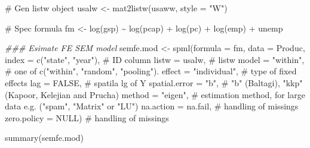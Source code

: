 \documentclass[
  letterpaper,
]{scrbook}
\newenvironment{Shaded}{\begin{snugshade}}{\end{snugshade}}
\newcommand{\AttributeTok}[1]{\textcolor[rgb]{0.40,0.45,0.13}{#1}}
\newcommand{\CommentTok}[1]{\textcolor[rgb]{0.37,0.37,0.37}{#1}}
\newcommand{\ConstantTok}[1]{\textcolor[rgb]{0.56,0.35,0.01}{#1}}
\newcommand{\DocumentationTok}[1]{\textcolor[rgb]{0.37,0.37,0.37}{\textit{#1}}}
\newcommand{\FunctionTok}[1]{\textcolor[rgb]{0.28,0.35,0.67}{#1}}
\newcommand{\NormalTok}[1]{\textcolor[rgb]{0.00,0.23,0.31}{#1}}
\newcommand{\OtherTok}[1]{\textcolor[rgb]{0.00,0.23,0.31}{#1}}
\newcommand{\SpecialCharTok}[1]{\textcolor[rgb]{0.37,0.37,0.37}{#1}}
\newcommand{\StringTok}[1]{\textcolor[rgb]{0.13,0.47,0.30}{#1}}
\begin{document}
\begin{Shaded}
\begin{Highlighting}[]
\CommentTok{\# Gen listw object}
\NormalTok{usalw }\OtherTok{\textless{}{-}} \FunctionTok{mat2listw}\NormalTok{(usaww, }\AttributeTok{style =} \StringTok{"W"}\NormalTok{)}

\CommentTok{\# Spec formula}
\NormalTok{fm }\OtherTok{\textless{}{-}} \FunctionTok{log}\NormalTok{(gsp) }\SpecialCharTok{\textasciitilde{}} \FunctionTok{log}\NormalTok{(pcap) }\SpecialCharTok{+} \FunctionTok{log}\NormalTok{(pc) }\SpecialCharTok{+} \FunctionTok{log}\NormalTok{(emp) }\SpecialCharTok{+}\NormalTok{ unemp}

\DocumentationTok{\#\#\# Esimate FE SEM model}
\NormalTok{semfe.mod }\OtherTok{\textless{}{-}} \FunctionTok{spml}\NormalTok{(}\AttributeTok{formula =}\NormalTok{ fm, }\AttributeTok{data =}\NormalTok{ Produc, }
                  \AttributeTok{index =} \FunctionTok{c}\NormalTok{(}\StringTok{"state"}\NormalTok{, }\StringTok{"year"}\NormalTok{),  }\CommentTok{\# ID column}
                  \AttributeTok{listw =}\NormalTok{ usalw,          }\CommentTok{\# listw}
                  \AttributeTok{model =} \StringTok{"within"}\NormalTok{,       }\CommentTok{\# one of c("within", "random", "pooling").}
                  \AttributeTok{effect =} \StringTok{"individual"}\NormalTok{,  }\CommentTok{\# type of fixed effects}
                  \AttributeTok{lag =} \ConstantTok{FALSE}\NormalTok{,            }\CommentTok{\# spatila lg of Y}
                  \AttributeTok{spatial.error =} \StringTok{"b"}\NormalTok{,    }\CommentTok{\# "b" (Baltagi), "kkp" (Kapoor, Kelejian and Prucha)}
                  \AttributeTok{method =} \StringTok{"eigen"}\NormalTok{,       }\CommentTok{\# estimation method, for large data e.g. ("spam", "Matrix" or "LU")}
                  \AttributeTok{na.action =}\NormalTok{ na.fail,    }\CommentTok{\# handling of missings}
                  \AttributeTok{zero.policy =} \ConstantTok{NULL}\NormalTok{)     }\CommentTok{\# handling of missings}

\FunctionTok{summary}\NormalTok{(semfe.mod)}
\end{Highlighting}
\end{Shaded}
\end{document}
